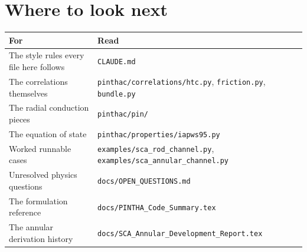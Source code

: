 \documentclass[11pt]{article}
\newcommand{\code}[1]{\texttt{#1}}
\begin{document}
\section{Where to look next}

\begin{center}
\begin{tabular}{lp{8.6cm}}
\toprule
For & Read \\
\midrule
The style rules every file here follows & \code{CLAUDE.md} \\
The correlations themselves & \code{pinthac/correlations/htc.py}, \code{friction.py}, \code{bundle.py} \\
The radial conduction pieces & \code{pinthac/pin/} \\
The equation of state & \code{pinthac/properties/iapws95.py} \\
Worked runnable cases & \code{examples/sca\_rod\_channel.py}, \code{examples/sca\_annular\_channel.py} \\
Unresolved physics questions & \code{docs/OPEN\_QUESTIONS.md} \\
The formulation reference & \code{docs/PINTHA\_Code\_Summary.tex} \\
The annular derivation history & \code{docs/SCA\_Annular\_Development\_Report.tex} \\
\bottomrule
\end{tabular}
\end{center}
\end{document}
